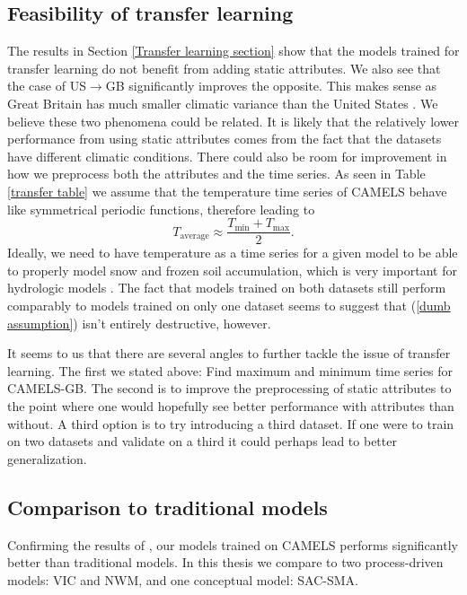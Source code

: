 \subsection{Feasibility of transfer learning}
The results in Section \ref{Transfer learning section} show that the models trained 
for transfer learning do not benefit from adding static attributes. We also see 
that the case of US$\rightarrow$GB significantly improves the opposite. This makes 
sense as Great Britain has much smaller climatic variance than the United States 
\citationneeded. We believe these two phenomena could be related. It is likely 
that the relatively lower performance from using static attributes comes from the 
fact that the datasets have different climatic conditions. There could also be 
room for improvement in how we preprocess both the attributes and the time series. 
As seen in Table \ref{transfer table} we assume that the temperature time series 
of CAMELS behave like symmetrical periodic functions, therefore leading to 
\begin{equation}
T_\text{average} \approx  \frac{T_\text{min}+T_\text{max}}{2}. \label{dumb assumption}
\end{equation}
Ideally, we need to have temperature as a time series for a given model to be able 
to properly model snow and frozen soil accumulation, which is very important for 
hydrologic models \citationneeded. The fact that models trained on both datasets 
still perform comparably to models trained on only one dataset seems to suggest 
that (\ref{dumb assumption}) isn't entirely destructive, however.

It seems to us that there are several angles to further tackle the issue of transfer 
learning. The first we stated above: Find maximum and minimum time series for 
CAMELS-GB. The second is to improve the preprocessing of static attributes to 
the point where one would hopefully see better performance with attributes than 
without. A third option is to try introducing a third dataset. If one were to 
train on two datasets and validate on a third it could perhaps lead to better 
generalization. 
\subsection{Comparison to traditional models}
Confirming the results of \citet{lstm_second_paper,lstm_third_paper}, our models 
trained on CAMELS performs significantly better than traditional models. In this 
thesis we compare to two process-driven models: VIC and NWM, and one conceptual 
model: SAC-SMA. 


